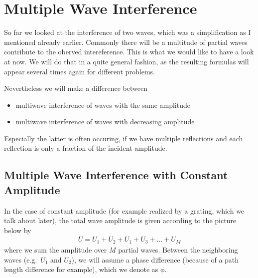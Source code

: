 \documentclass[letterpaper,10pt,english]{sphinxmanual}
\begin{document}
\section{Multiple Wave Interference}
\label{\detokenize{notebooks/L10/Interference:Multiple-Wave-Interference}}
So far we looked at the interference of two waves, which was a simplification as I mentioned already earlier. Commonly there will be a multitude of partial waves contribute to the oberved intereference. This is what we would like to have a look at now. We will do that in a quite general fashion, as the resulting formulas will appear several times again for different problems.

Nevertheless we will make a difference between
\begin{itemize}
\item {} 
multiwave interference of waves with the same amplitude

\item {} 
multiwave interference of waves with decreasing amplitude

\end{itemize}

Especially the latter is often occuring, if we have multiple reflections and each reflection is only a fraction of the incident amplitude.


\subsection{Multiple Wave Interference with Constant Amplitude}
\label{\detokenize{notebooks/L10/Interference:Multiple-Wave-Interference-with-Constant-Amplitude}}
In the case of constant amplitude (for example realized by a grating, which we talk about later), the total wave amplitude is given according to the picture below by
\begin{equation*}
\begin{split}U=U_1+U_2+U_1+U_3+\ldots+U_M\end{split}
\end{equation*}
where we sum the amplitude over \(M\) partial waves. Between the neighboring waves (e.g. \(U_1\) and \(U_2\)), we will assume a phase difference (because of a path length difference for example), which we denote as \(\phi\).
\end{document}
